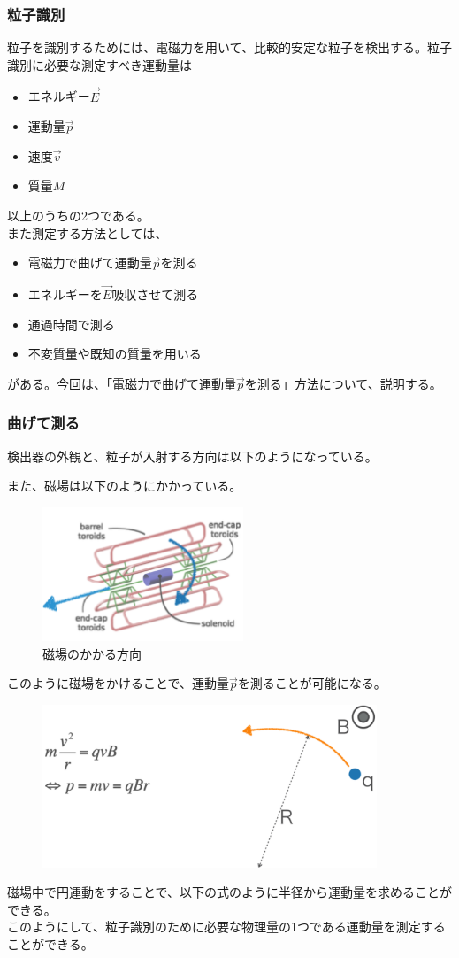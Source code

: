 \documentclass[10pt]{ujarticle}
\begin{document}
\subsubsection{粒子識別}
粒子を識別するためには、電磁力を用いて、比較的安定な粒子を検出する。粒子識別に必要な測定すべき運動量は
\begin{itemize}
\item エネルギー$\vec{E}$
\item 運動量$\vec{p}$
\item 速度$\vec{v}$
\item 質量$M$
\end{itemize}
以上のうちの2つである。\\
また測定する方法としては、
\begin{itemize}
\item 電磁力で曲げて運動量$\vec{p}$を測る
\item エネルギーを$\vec{E}$吸収させて測る
\item 通過時間で測る
\item 不変質量や既知の質量を用いる
\end {itemize}
がある。今回は、「電磁力で曲げて運動量$\vec{p}$を測る」方法について、説明する。

\subsubsection{曲げて測る}
検出器の外観と、粒子が入射する方向は以下のようになっている。

また、磁場は以下のようにかかっている。
\begin{figure}[h]
\begin{center}
\includegraphics[width=6cm]{./magne.png}
\caption{磁場のかかる方向}
\end{center}
\end{figure}

このように磁場をかけることで、運動量$\vec{p}$を測ることが可能になる。\\
\begin{figure}[h]
\begin{center}
\includegraphics[width=10cm]{./circle.png}
\end{center}
\end{figure}
磁場中で円運動をすることで、以下の式のように半径から運動量を求めることができる。\\
このようにして、粒子識別のために必要な物理量の1つである運動量を測定することができる。
\end{document}
